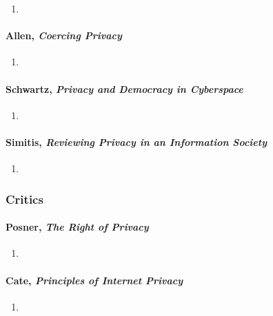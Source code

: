 \begin{enumerate}
    \item %
\end{enumerate}

\paragraph{Allen, \emph{Coercing Privacy}}

\begin{enumerate}
    \item %
\end{enumerate}

\paragraph{Schwartz, \emph{Privacy and Democracy in Cyberspace}}

\begin{enumerate}
    \item %
\end{enumerate}

\paragraph{Simitis, \emph{Reviewing Privacy in an Information Society}}

\begin{enumerate}
    \item %
\end{enumerate}

\subsubsection{Critics}

\paragraph{Posner, \emph{The Right of Privacy}}

\begin{enumerate}
    \item %
\end{enumerate}

\paragraph{Cate, \emph{Principles of Internet Privacy}}

\begin{enumerate}
    \item %
\end{enumerate}

